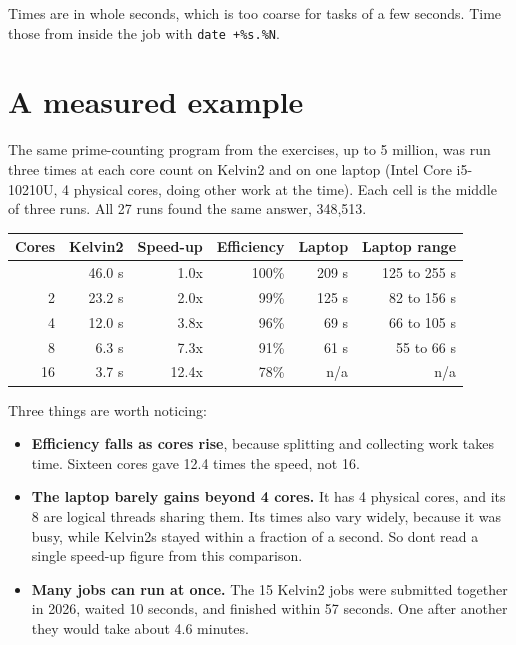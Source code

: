 Times are in whole seconds, which is too coarse for tasks of a few seconds. Time those from inside the job with \texttt{date\ +\%s.\%N}.

\section{A measured example}\label{a-measured-example}

The same prime-counting program from the exercises, up to 5 million, was run three times at each core count on Kelvin2 and on one laptop (Intel Core i5-10210U, 4 physical cores, doing other work at the time). Each cell is the middle of three runs. All 27 runs found the same answer, 348,513.

{\def\LTcaptype{none} %
\begin{longtable}[]{@{}rrrrrr@{}}
\toprule\noalign{}
Cores & Kelvin2 & Speed-up & Efficiency & Laptop & Laptop range \\
\midrule\noalign{}
\endhead
\bottomrule\noalign{}
\endlastfoot
1 & 46.0 s & 1.0x & 100\% & 209 s & 125 to 255 s \\
2 & 23.2 s & 2.0x & 99\% & 125 s & 82 to 156 s \\
4 & 12.0 s & 3.8x & 96\% & 69 s & 66 to 105 s \\
8 & 6.3 s & 7.3x & 91\% & 61 s & 55 to 66 s \\
16 & 3.7 s & 12.4x & 78\% & n/a & n/a \\
\end{longtable}
}

Three things are worth noticing:

\begin{itemize}
\tightlist
\item
  \textbf{Efficiency falls as cores rise}, because splitting and collecting work takes time. Sixteen cores gave 12.4 times the speed, not 16.
\item
  \textbf{The laptop barely gains beyond 4 cores.} It has 4 physical cores, and its 8 are logical threads sharing them. Its times also vary widely, because it was busy, while Kelvin2\textquotesingle s stayed within a fraction of a second. So don\textquotesingle t read a single speed-up figure from this comparison.
\item
  \textbf{Many jobs can run at once.} The 15 Kelvin2 jobs were submitted together in 2026, waited 10 seconds, and finished within 57 seconds. One after another they would take about 4.6 minutes.
\end{itemize}

